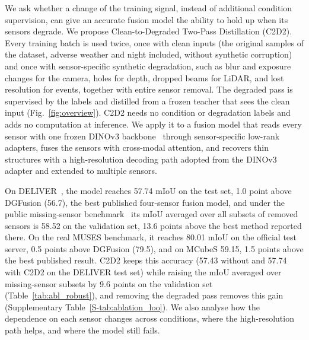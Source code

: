 We ask whether a change of the training signal, instead of additional condition supervision, can give an accurate fusion model the ability to hold up when its sensors degrade. We propose Clean-to-Degraded Two-Pass Distillation (C2D2). Every training batch is used twice, once with clean inputs (the original samples of the dataset, adverse weather and night included, without synthetic corruption) and once with sensor-specific synthetic degradation, such as blur and exposure changes for the camera, holes for depth, dropped beams for LiDAR, and lost resolution for events, together with entire sensor removal. The degraded pass is supervised by the labels and distilled from a frozen teacher that sees the clean input (Fig.~\ref{fig:overview}). C2D2 needs no condition or degradation labels and adds no computation at inference. We apply it to a fusion model that reads every sensor with one frozen DINOv3 backbone~\cite{dinov3_2025} through sensor-specific low-rank adapters, fuses the sensors with cross-modal attention, and recovers thin structures with a high-resolution decoding path adopted from the DINOv3 adapter and extended to multiple sensors.

On DELIVER~\cite{cmnext2023}, the model reaches 57.74 mIoU on the test set, 1.0 point above DGFusion (56.7), the best published four-sensor fusion model, and under the public missing-sensor benchmark~\cite{mmssbench2025} its mIoU averaged over all subsets of removed sensors is 58.52 on the validation set, 13.6 points above the best method reported there. On the real MUSES benchmark, it reaches 80.01 mIoU on the official test server, 0.5 points above DGFusion (79.5), and on MCubeS 59.15, 1.5 points above the best published result. C2D2 keeps this accuracy (57.43 without and 57.74 with C2D2 on the DELIVER test set) while raising the mIoU averaged over missing-sensor subsets by 9.6 points on the validation set (Table~\ref{tab:abl_robust}), and removing the degraded pass removes this gain (Supplementary Table~\ref{S-tab:ablation_loo}). We also analyse how the dependence on each sensor changes across conditions, where the high-resolution path helps, and where the model still fails.


